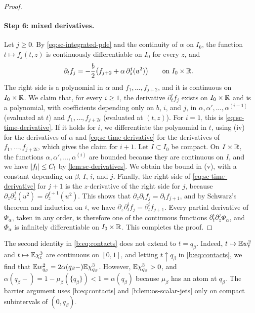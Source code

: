 \begin{proof}
\paragraph{Step 6: mixed derivatives.}
Let $j\ge0$. By \eqref{eq:sc-integrated-pde} and the continuity of $\alpha$
on $I_0$, the function $t\mapsto f_j(t,z)$ is continuously differentiable on
$I_0$ for every $z$, and
\begin{equation}\label{eq:sc-time-derivative}
 \partial_tf_j=-\frac b2\bigl(f_{j+2}+\alpha\,\partial_z^j(u^2)\bigr)
 \qquad\text{on }I_0\times\mathbb R.
\end{equation}
The right side is a polynomial in $\alpha$ and $f_1,\dots,f_{j+2}$, and it is
continuous on $I_0\times\mathbb R$. We claim that, for every $i\ge1$, the
derivative $\partial_t^if_j$ exists on $I_0\times\mathbb R$ and is a polynomial,
with coefficients depending only on $b$, $i$, and $j$, in
$\alpha,\alpha',\dots,\alpha^{(i-1)}$ (evaluated at $t$) and
$f_1,\dots,f_{j+2i}$ (evaluated at $(t,z)$). For $i=1$, this is
\eqref{eq:sc-time-derivative}. If it holds for $i$, we differentiate the
polynomial in $t$, using (iv) for the derivatives of $\alpha$ and
\eqref{eq:sc-time-derivative} for the derivatives of $f_1,\dots,f_{j+2i}$,
which gives the claim for $i+1$. Let $I\subset I_0$ be compact. On
$I\times\mathbb R$, the functions $\alpha,\alpha',\dots,\alpha^{(i)}$ are bounded
because they are continuous on $I$, and we have $\lvert f_l\rvert\le C_l$ by
\cref{lem:sc-derivatives}. We obtain the bound in (v), with a constant
depending on $\beta$, $I$, $i$, and $j$. Finally, the right side of \eqref{eq:sc-time-derivative} for $j+1$
is the $z$-derivative of the right side for $j$, because
$\partial_z\partial_z^j(u^2)=\partial_z^{j+1}(u^2)$. This shows that
$\partial_z\partial_tf_j=\partial_tf_{j+1}$, and by Schwarz's theorem and
induction on $i$, we have $\partial_z\partial_t^if_j=\partial_t^if_{j+1}$.
Every partial derivative of $\Phi_\alpha$, taken in any order, is therefore
one of the continuous functions $\partial_t^i\partial_z^j\Phi_\alpha$, and
$\Phi_\alpha$ is infinitely differentiable on $I_0\times\mathbb R$. This completes
the proof.
\end{proof}

\begin{remark}\label{rem:sc-upper-atom}
The second identity in \eqref{b:eq:contacts} does not extend to
$t=q_\beta$. Indeed, $t\mapsto\mathbb E w_t^2$ and $t\mapsto\mathbb E\chi_t^3$ are
continuous on $[0,1]$, and letting $t\uparrow q_\beta$ in
\eqref{b:eq:contacts}, we find that
$\mathbb E w_{q_\beta}^2=2\alpha(q_\beta-)\mathbb E\chi_{q_\beta}^3$. However,
$\mathbb E\chi_{q_\beta}^3>0$, and
$\alpha(q_\beta-)=1-\mu_\beta(\{q_\beta\})<1=\alpha(q_\beta)$ because
$\mu_\beta$ has an atom at $q_\beta$. The barrier argument uses
\eqref{b:eq:contacts} and \cref{b:lem:os-scalar-jets} only on compact
subintervals of $(0,q_\beta)$.
\end{remark}

